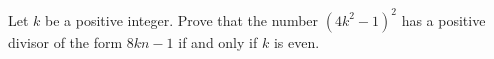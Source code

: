 Let $k$ be a positive integer. Prove that the number $(4k^{2}-1)^{2}$ has a positive divisor of the form $8kn-1$ if and only if $k$ is even.
